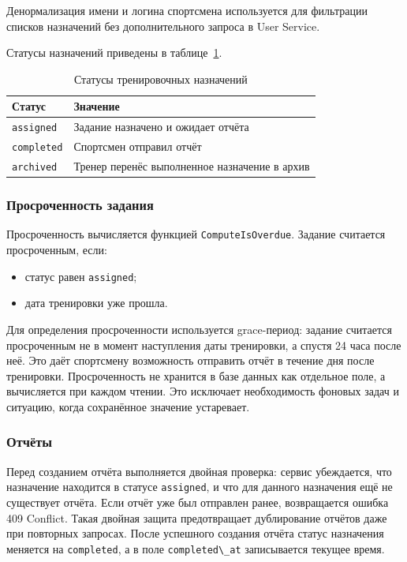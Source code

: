 Денормализация имени и логина спортсмена используется для фильтрации списков назначений без дополнительного запроса в User Service.

Статусы назначений приведены в таблице~\ref{tab:assignment-statuses}.

\begin{longtable}{|>{\raggedright\arraybackslash}p{}|>{\raggedright\arraybackslash}p{}|}
\caption{Статусы тренировочных назначений}\label{tab:assignment-statuses}\\
\hline
Статус & Значение \\
\hline
\endhead
\hline
\endlastfoot
\passthrough{\lstinline!assigned!} & Задание назначено и ожидает отчёта \\ \hline
\passthrough{\lstinline!completed!} & Спортсмен отправил отчёт \\ \hline
\passthrough{\lstinline!archived!} & Тренер перенёс выполненное назначение в архив \\ \hline
\end{longtable}

\subsubsection{Просроченность задания}

Просроченность вычисляется функцией \passthrough{\lstinline!ComputeIsOverdue!}. Задание считается просроченным, если:

\begin{itemize}
\tightlist
\item
  статус равен \passthrough{\lstinline!assigned!};
\item
  дата тренировки уже прошла.
\end{itemize}

Для определения просроченности используется grace-период: задание считается просроченным не в момент наступления даты тренировки, а спустя 24 часа после неё. Это даёт спортсмену возможность отправить отчёт в течение дня после тренировки. Просроченность не хранится в базе данных как отдельное поле, а вычисляется при каждом чтении. Это исключает необходимость фоновых задач и ситуацию, когда сохранённое значение устаревает.

\subsubsection{Отчёты}

Перед созданием отчёта выполняется двойная проверка: сервис убеждается, что назначение находится в статусе \passthrough{\lstinline!assigned!}, и что для данного назначения ещё не существует отчёта. Если отчёт уже был отправлен ранее, возвращается ошибка 409 Conflict. Такая двойная защита предотвращает дублирование отчётов даже при повторных запросах. После успешного создания отчёта статус назначения меняется на \passthrough{\lstinline!completed!}, а в поле \passthrough{\lstinline!completed\_at!} записывается текущее время.

